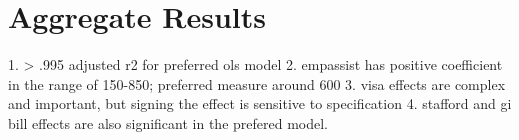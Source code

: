 \documentclass[review]{elsarticle}
\begin{document}
    \section{Aggregate Results}

    1. > .995 adjusted r2 for preferred ols model
    2. empassist has positive coefficient in the range of 150-850; preferred measure around 600
    3. visa effects are complex and important, but signing the effect is sensitive to specification
    4. stafford and gi bill effects are also significant in the prefered model.

    
    
    
    
\end{document}

